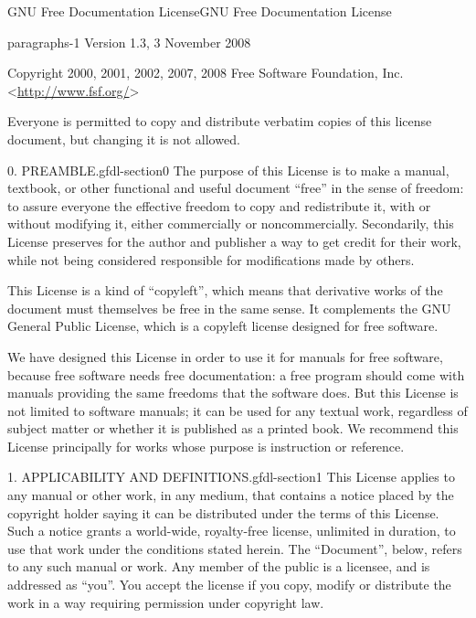 \documentclass[10pt,]{book}
\numberwithin{equation}{section}
\begin{document}
\typeout{************************************************}
%
%
\appendix
%
\begin{appendixptx}{GNU Free Documentation License}{}{GNU Free Documentation License}{}{}\label{appendix-gfdl}
\begin{paragraphs}{}{paragraphs-1}%
\hypertarget{p-1306}{}%
Version 1.3, 3 November 2008%
\par
\hypertarget{p-1307}{}%
Copyright \textcopyright{} 2000, 2001, 2002, 2007, 2008 Free Software Foundation, Inc. \textless{}\url{http://www.fsf.org/}\textgreater{}%
\par
\hypertarget{p-1308}{}%
Everyone is permitted to copy and distribute verbatim copies of this license document, but changing it is not allowed.%
\end{paragraphs}%
\begin{paragraphs}{0. PREAMBLE.}{gfdl-section0}%
\hypertarget{p-1309}{}%
The purpose of this License is to make a manual, textbook, or other functional and useful document ``free'' in the sense of freedom: to assure everyone the effective freedom to copy and redistribute it, with or without modifying it, either commercially or noncommercially. Secondarily, this License preserves for the author and publisher a way to get credit for their work, while not being considered responsible for modifications made by others.%
\par
\hypertarget{p-1310}{}%
This License is a kind of ``copyleft'', which means that derivative works of the document must themselves be free in the same sense. It complements the GNU General Public License, which is a copyleft license designed for free software.%
\par
\hypertarget{p-1311}{}%
We have designed this License in order to use it for manuals for free software, because free software needs free documentation: a free program should come with manuals providing the same freedoms that the software does. But this License is not limited to software manuals; it can be used for any textual work, regardless of subject matter or whether it is published as a printed book. We recommend this License principally for works whose purpose is instruction or reference.%
\end{paragraphs}%
\begin{paragraphs}{1. APPLICABILITY AND DEFINITIONS.}{gfdl-section1}%
\hypertarget{p-1312}{}%
This License applies to any manual or other work, in any medium, that contains a notice placed by the copyright holder saying it can be distributed under the terms of this License. Such a notice grants a world-wide, royalty-free license, unlimited in duration, to use that work under the conditions stated herein. The ``Document'', below, refers to any such manual or work. Any member of the public is a licensee, and is addressed as ``you''. You accept the license if you copy, modify or distribute the work in a way requiring permission under copyright law.%

\end{paragraphs}
\end{appendixptx}
\end{document}
